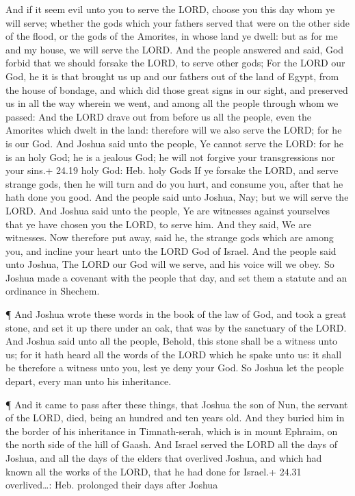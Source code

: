  And if it seem evil unto you to serve the LORD, choose you
this day whom ye will serve; whether the gods which your fathers served
that were on the other side of the flood, or the gods of the Amorites,
in whose land ye dwell: but as for me and my house, we will serve the
LORD.  And the people answered and said, God forbid that we
should forsake the LORD, to serve other gods;  For the LORD
our God, he it is that brought us up and our fathers out of the land of
Egypt, from the house of bondage, and which did those great signs in our
sight, and preserved us in all the way wherein we went, and among all
the people through whom we passed:  And the LORD drave out
from before us all the people, even the Amorites which dwelt in the
land: therefore will we also serve the LORD; for he is our God.
 And Joshua said unto the people, Ye cannot serve the LORD:
for he is an holy God; he is a jealous God; he will not forgive your
transgressions nor your sins.+ 24.19 holy God: Heb. holy Gods
 If ye forsake the LORD, and serve strange gods, then he
will turn and do you hurt, and consume you, after that he hath done you
good.  And the people said unto Joshua, Nay; but we will
serve the LORD.  And Joshua said unto the people, Ye are
witnesses against yourselves that ye have chosen you the LORD, to serve
him. And they said, We are witnesses.  Now therefore put
away, said he, the strange gods which are among you, and incline your
heart unto the LORD God of Israel.  And the people said
unto Joshua, The LORD our God will we serve, and his voice will we obey.
 So Joshua made a covenant with the people that day, and
set them a statute and an ordinance in Shechem.

 ¶ And Joshua wrote these words in the book of the law of
God, and took a great stone, and set it up there under an oak, that was
by the sanctuary of the LORD.  And Joshua said unto all the
people, Behold, this stone shall be a witness unto us; for it hath heard
all the words of the LORD which he spake unto us: it shall be therefore
a witness unto you, lest ye deny your God.  So Joshua let
the people depart, every man unto his inheritance.

 ¶ And it came to pass after these things, that Joshua the
son of Nun, the servant of the LORD, died, being an hundred and ten
years old.  And they buried him in the border of his
inheritance in Timnath-serah, which is in mount Ephraim, on the north
side of the hill of Gaash.  And Israel served the LORD all
the days of Joshua, and all the days of the elders that overlived
Joshua, and which had known all the works of the LORD, that he had done
for Israel.+ 24.31 overlived\ldots: Heb. prolonged their days after
Joshua

